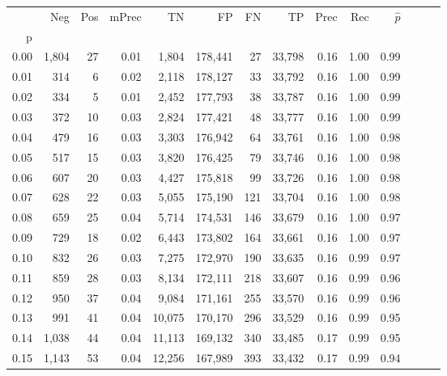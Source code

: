 \begin{tabular}{rrrrrrrrrrrrrr}
\toprule
{} &    Neg &  Pos & mPrec &       TN &       FP &      FN &      TP &  Prec &   Rec & $\hat{p}$ \\
p    &        &      &       &          &          &         &         &       &       &           \\
\midrule
0.00 &  1,804 &   27 &  0.01 &    1,804 &  178,441 &      27 &  33,798 &  0.16 &  1.00 &      0.99 \\
0.01 &    314 &    6 &  0.02 &    2,118 &  178,127 &      33 &  33,792 &  0.16 &  1.00 &      0.99 \\
0.02 &    334 &    5 &  0.01 &    2,452 &  177,793 &      38 &  33,787 &  0.16 &  1.00 &      0.99 \\
0.03 &    372 &   10 &  0.03 &    2,824 &  177,421 &      48 &  33,777 &  0.16 &  1.00 &      0.99 \\
0.04 &    479 &   16 &  0.03 &    3,303 &  176,942 &      64 &  33,761 &  0.16 &  1.00 &      0.98 \\
0.05 &    517 &   15 &  0.03 &    3,820 &  176,425 &      79 &  33,746 &  0.16 &  1.00 &      0.98 \\
0.06 &    607 &   20 &  0.03 &    4,427 &  175,818 &      99 &  33,726 &  0.16 &  1.00 &      0.98 \\
0.07 &    628 &   22 &  0.03 &    5,055 &  175,190 &     121 &  33,704 &  0.16 &  1.00 &      0.98 \\
0.08 &    659 &   25 &  0.04 &    5,714 &  174,531 &     146 &  33,679 &  0.16 &  1.00 &      0.97 \\
0.09 &    729 &   18 &  0.02 &    6,443 &  173,802 &     164 &  33,661 &  0.16 &  1.00 &      0.97 \\
0.10 &    832 &   26 &  0.03 &    7,275 &  172,970 &     190 &  33,635 &  0.16 &  0.99 &      0.97 \\
0.11 &    859 &   28 &  0.03 &    8,134 &  172,111 &     218 &  33,607 &  0.16 &  0.99 &      0.96 \\
0.12 &    950 &   37 &  0.04 &    9,084 &  171,161 &     255 &  33,570 &  0.16 &  0.99 &      0.96 \\
0.13 &    991 &   41 &  0.04 &   10,075 &  170,170 &     296 &  33,529 &  0.16 &  0.99 &      0.95 \\
0.14 &  1,038 &   44 &  0.04 &   11,113 &  169,132 &     340 &  33,485 &  0.17 &  0.99 &      0.95 \\
0.15 &  1,143 &   53 &  0.04 &   12,256 &  167,989 &     393 &  33,432 &  0.17 &  0.99 &      0.94 \\

\end{tabular}
